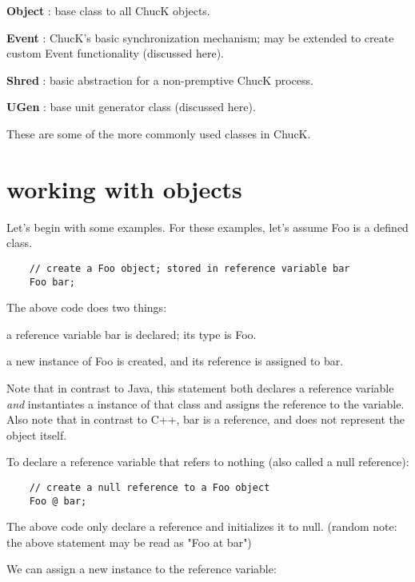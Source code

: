 \begin{chuckitemize}
\item {\bf Object} : base class to all ChucK objects.
\item {\bf Event} : ChucK's basic synchronization mechanism; may be extended to create custom Event functionality (discussed here).
\item {\bf Shred} : basic abstraction for a non-premptive ChucK process.
\item {\bf UGen} : base unit generator class (discussed here).
\end{chuckitemize}


These are some of the more commonly used classes in ChucK.

\section{working with objects}

Let's begin with some examples. For these examples, let's assume Foo is a defined class.
\begin{verbatim}
    // create a Foo object; stored in reference variable bar
    Foo bar;
\end{verbatim}

The above code does two things:

\begin{chuckitemize}
\item a reference variable bar is declared; its type is Foo.
\item a new instance of Foo is created, and its reference is assigned to bar.
\end{chuckitemize}

Note that in contrast to Java, this statement both declares a reference variable {\it and} instantiates a instance of that class and assigns the reference to the variable. Also note that in contrast to C++, bar is a reference, and does not represent the object itself.

To declare a reference variable that refers to nothing (also called a null reference):

\begin{verbatim}
    // create a null reference to a Foo object
    Foo @ bar;
\end{verbatim}

The above code only declare a reference and initializes it to null. (random note: the above statement may be read as "Foo at bar")

We can assign a new instance to the reference variable:

